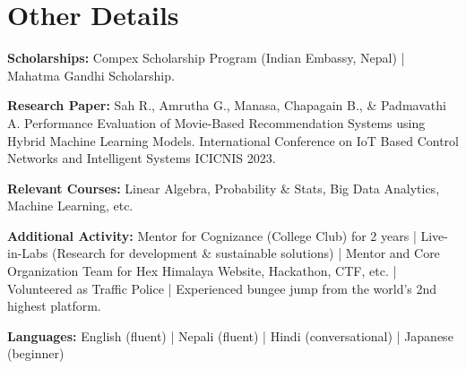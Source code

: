 \documentclass[a4paper,11pt]{article}
\begin{document}
\section{Other Details}
\begin{itemize}[leftmargin=0.15in, label={}]
	\setlength\itemsep{-2pt}
	\small{
\item{
		      \textbf{Scholarships:}{ Compex Scholarship Program (Indian Embassy, Nepal) | Mahatma Gandhi Scholarship.} \\
		}

\item{
		      \textbf{Research Paper:}{ Sah R., Amrutha G., Manasa, Chapagain B., \& Padmavathi A. Performance Evaluation of Movie-Based Recommendation Systems using Hybrid Machine Learning Models. International Conference on IoT Based Control Networks and Intelligent Systems ICICNIS 2023.
		      	} \\
		}
		
		\item{
		      \textbf{Relevant Courses:}{ Linear Algebra, Probability \& Stats, Big Data Analytics, Machine Learning, etc.} \\
		}

    	
 
 \item{
		\textbf{Additional Activity:}{ Mentor for Cognizance (College Club) for 2 years | Live-in-Labs (Research for development \& sustainable solutions) | Mentor and Core Organization Team for Hex Himalaya Website, Hackathon, CTF, etc.} | Volunteered as Traffic Police |  Experienced bungee jump from the world's 2nd highest platform. \\
		}

		\item{
		      \textbf{Languages:}{ English (fluent) | Nepali (fluent) | Hindi (conversational) | Japanese (beginner)}
	}
 
 }
\end{itemize}

\end{document}
